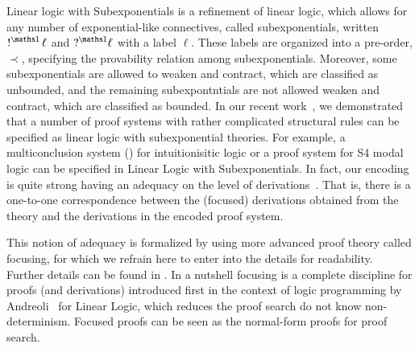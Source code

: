\documentclass[a4paper,10pt]{article}
\begin{document}
Linear logic with Subexponentials is a refinement of linear logic, which allows for any number of 
exponential-like connectives, called subexponentials, written $\nbang{\ell}$ and $\nquest{\ell}$ with a label $\ell$. These labels
 are organized into a pre-order, $\prec$, specifying the provability relation among subexponentials. Moreover, some subexponentials 
 are allowed to weaken and contract, which are classified as unbounded, and the remaining subexpontntials are not allowed 
 weaken and contract, which are classified as bounded. 
In our recent work~\cite{nigam.jlc}, we demonstrated
that a number of proof systems with rather complicated structural rules can be specified as linear logic with subexponential 
theories. For example, a multiconclusion system (\mLJ) for intuitionisitic logic or a proof system for S4 modal logic can be specified in 
Linear Logic with Subexponentials. 
In fact, our encoding is quite strong having an adequacy on the level of 
derivations~\cite{nigam10jar}. That is, there is a one-to-one correspondence between the (focused) derivations
obtained from the theory and the derivations in the encoded proof system. 

This notion of adequacy is formalized by using more advanced proof theory called focusing, for which we refrain here to 
enter into the details for readability. Further details can be found in \cite{nigam.jlc}. In a nutshell focusing
is a complete discipline for proofs (and derivations) introduced first in the context of logic programming 
by Andreoli~\cite{andreoli92jlc} for Linear 
Logic, which reduces the proof search do not know non-determinism. Focused proofs can be seen as the normal-form proofs for 
proof search. 
\end{document}
